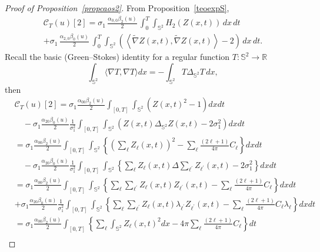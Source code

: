 \documentclass[AHL,Unicode,longabstracts,published]{cedram}
\newcommand{\clC}{\mathcal{C}}
\newcommand{\bbS}{\mathbb{S}}
\newcommand{\bbR}{\mathbb{R}}
\begin{document}
\begin{proof}[{Proof of Proposition~\ref{propcaos2}}]
From Proposition~\ref{teoexpS},
\begin{multline*}
\clC_T(u)[2] = \sigma_1 \,\frac{\alpha _{0,0}\beta _{2}(u)}{2}
\,\int_0^T \int_{\bbS^2} H_{2}(Z(x,t))\,dx\,dt \\
+\sigma_1 \,\frac{\alpha _{2,0}\beta _{0}(u)}{2} \, \int_0^T\int_{\bbS^2}
\left(\left\langle \widetilde \nabla Z(x,t), \widetilde \nabla Z(x,t)\right\rangle - 2 \right)\,dx\,dt.
\end{multline*}
Recall the basic (Green--Stokes) identity for a regular function $T:\bbS ^2\to \bbR$
\begin{equation*}
\int_{\bbS^{2}} \langle \nabla T, \nabla T \rangle dx=-\int_{\bbS ^{2}}T\Delta_{\bbS^2} T\,dx,
\end{equation*}
then
\begingroup
\allowdisplaybreaks
\begin{align*}
&\clC_T(u)[2] = \sigma_1 \frac{\alpha _{00}\beta _{2}(u)}{2}\int_{[0,T]}\int_{\bbS ^{2}} \left(Z(x,t)^{2}-1\right) dxdt
\\
&\quad -\sigma_1 \frac{\alpha _{20}\beta _{0}(u)}{2}\frac{1}{\sigma_1^2}\int_{[0,T]}\int_{
\bbS^{2}} \left(Z(x,t) \Delta_{\bbS^2} Z(x,t) - 2\sigma_1^2\right) d x dt\\
&=\sigma_1 \frac{\alpha _{00}\beta _{2}(u)}{2}\int_{[0,T]}\int_{\bbS ^{2}}\left\{ \left(\sum_{\ell }Z_{\ell }(x,t)\right)^{2}-\sum_{\ell }\frac{ (2\ell +1)}{4\pi }C_{\ell }\right\} dxdt \\
&\quad -\sigma_1 \frac{\alpha _{20}\beta _{0}(u)}{2}\frac{1}{\sigma_1^2}\int_{[0,T]}\int_{\bbS^{2}}\left\{\sum_{\ell }Z_{\ell }(x,t)\Delta \sum_{\ell ^{\prime }}Z_{\ell ^{\prime }}(x,t)-2\sigma_1^2\right\} dx dt\\
&=\sigma_1 \frac{\alpha _{00}\beta _{2}(u)}{2}\int_{[0,T]}\int_{\bbS ^{2}}\left\{\sum_{\ell} \sum_{\ell^{\prime}}Z_{\ell }(x,t)Z_{\ell^{\prime} }(x,t)-\sum_{\ell }\frac{(2\ell +1)}{4\pi }C_{\ell }\right\} dxdt \\
&+\sigma_1 \frac{\alpha _{20}\beta _{0}(u)}{2}\frac{1}{\sigma_1^2}\int_{[0,T]}\int_{\bbS^{2}}\left\{ \sum_{\ell }\sum_{\ell ^{\prime }}Z_{\ell }(x,t)\lambda _{\ell ^{\prime }}Z_{\ell ^{\prime }}(x,t)-\sum_{\ell } \frac{ (2\ell +1)}{4\pi }C_{\ell }\lambda _{\ell }\right\} dxdt\\
&=\sigma_1 \frac{\alpha _{00}\beta _{2}(u)}{2}\int_{[0,T]}\left\{ \sum_{\ell }\int_{\bbS ^{2}} Z_{\ell }(x,t)^{2} dx-4\pi\sum_{\ell }\frac{(2\ell +1)}{4\pi }C_{\ell }\right\} dt \\

\end{align*}
\end{proof}
\end{document}
